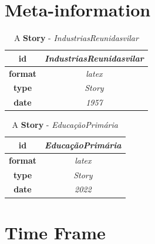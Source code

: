 \documentclass{article}
\begin{document}
\clearpage




	\section{Meta-information}

	
		\begin{table}[ht!]
			\centering
			\begin{tabular}{|c|c|}
				\hline
				
					\textbf{ id } & \textit{ IndustriasReunidasvilar } \\
					\hline
				
					\textbf{ format } & \textit{ latex } \\
					\hline
				
					\textbf{ type } & \textit{ Story } \\
					\hline
				
					\textbf{ date } & \textit{ 1957 } \\
					\hline
				
			\end{tabular}
			\caption{A \textbf{ Story }-\textit{ IndustriasReunidasvilar }} %
			\label{table:\arabic{tablecounter2}} %
		\end{table}
	
		\begin{table}[ht!]
			\centering
			\begin{tabular}{|c|c|}
				\hline
				
					\textbf{ id } & \textit{ EducaçãoPrimária } \\
					\hline
				
					\textbf{ format } & \textit{ latex } \\
					\hline
				
					\textbf{ type } & \textit{ Story } \\
					\hline
				
					\textbf{ date } & \textit{ 2022 } \\
					\hline
				
			\end{tabular}
			\caption{A \textbf{ Story }-\textit{ EducaçãoPrimária }} %
			\label{table:\arabic{tablecounter2}} %
		\end{table}
	

\clearpage

\section{Time Frame}

\newcommand{\foo}{\hspace{-2.3pt}$\bullet$ \hspace{5pt}}

\scalebox{1}{
\begin{tabular}{r |@{\foo} l}

\end{tabular}
}
\end{document}
